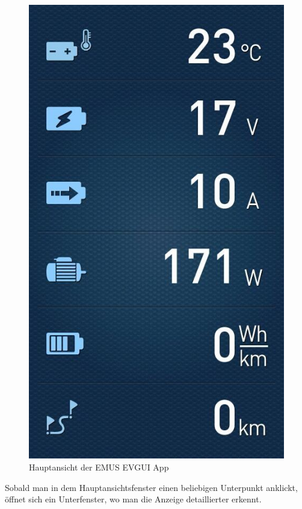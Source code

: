 \begin{figure}[H]
	\begin{center}
		\includegraphics[scale=0.4]{figures/Akku/EMUSAPP1.jpg}
		\caption{Hauptansicht der EMUS EVGUI App\cite{HauptansichtApp}}
		\label{fig: Hauptansicht der EMUS EVGUI App}
	\end{center}
\end{figure}

\newpage

Sobald man in dem Hauptansichtsfenster einen beliebigen Unterpunkt anklickt, öffnet sich ein Unterfenster, wo man die Anzeige detaillierter erkennt.

